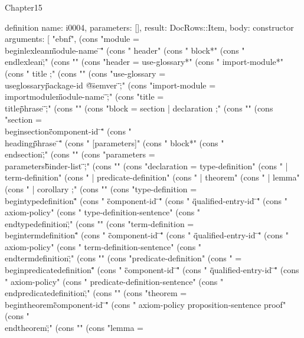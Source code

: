 \begin{lexlean}{Chapter15}
\begin{semanticmodule}
definition{
  name: i0004,
  parameters: [],
  result: DocRows::Item,
  body: constructor{
    arguments: [
      "ebnf",
      (cons "module          = \"\\begin{lexlean}\" \"{\" module-name \"}\"" (cons "                  header" (cons "                  block*" (cons "                  \"\\end{lexlean}\" ;" (cons "" (cons "header          = use-glossary*" (cons "                  import-module*" (cons "                  title ;" (cons "" (cons "use-glossary    = \"\\useglossary\" \"{\" package-id \"@\" semver \"}\" ;" (cons "import-module   = \"\\importmodule\" \"{\" module-name \"}\" ;" (cons "title           = \"\\title\" \"{\" phrase \"}\" ;" (cons "" (cons "block           = section | declaration ;" (cons "" (cons "section         = \"\\begin{section}\" \"{\" component-id \"}\"" (cons "                  \"\\heading\" \"{\" phrase \"}\"" (cons "                  [parameters]" (cons "                  block*" (cons "                  \"\\end{section}\" ;" (cons "" (cons "parameters      = \"\\parameters\" \"{\" binder-list \"}\" ;" (cons "" (cons "declaration     = type-definition" (cons "                | term-definition" (cons "                | predicate-definition" (cons "                | theorem" (cons "                | lemma" (cons "                | corollary ;" (cons "" (cons "type-definition = \"\\begin{typedefinition}\"" (cons "                  \"{\" component-id \"}\"" (cons "                  \"{\" qualified-entry-id \"}\"" (cons "                  axiom-policy" (cons "                  type-definition-sentence" (cons "                  \"\\end{typedefinition}\" ;" (cons "" (cons "term-definition = \"\\begin{termdefinition}\"" (cons "                  \"{\" component-id \"}\"" (cons "                  \"{\" qualified-entry-id \"}\"" (cons "                  axiom-policy" (cons "                  term-definition-sentence" (cons "                  \"\\end{termdefinition}\" ;" (cons "" (cons "predicate-definition" (cons "                = \"\\begin{predicatedefinition}\"" (cons "                  \"{\" component-id \"}\"" (cons "                  \"{\" qualified-entry-id \"}\"" (cons "                  axiom-policy" (cons "                  predicate-definition-sentence" (cons "                  \"\\end{predicatedefinition}\" ;" (cons "" (cons "theorem         = \"\\begin{theorem}\" \"{\" component-id \"}\"" (cons "                  axiom-policy proposition-sentence proof" (cons "                  \"\\end{theorem}\" ;" (cons "" (cons "lemma           = }}
\end{semanticmodule}
\end{lexlean}
